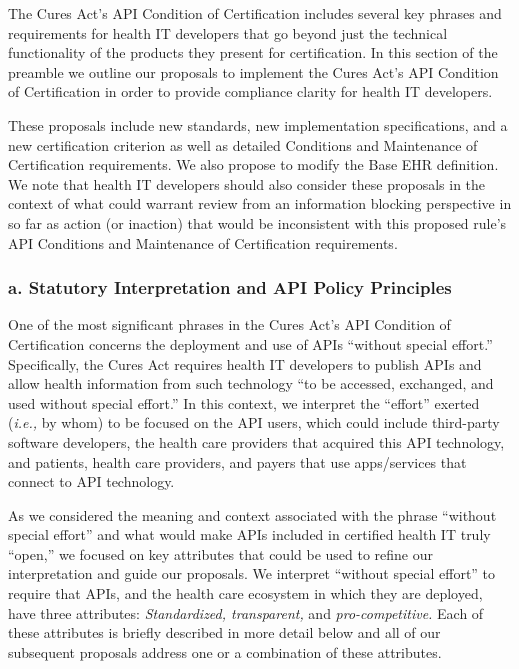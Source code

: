 \documentclass[twoside,11pt]{article}
\begin{document}
          The Cures Act's API Condition of Certification includes several key phrases and requirements for health IT developers that go beyond just the technical functionality of the products they present for certification. In this section of the preamble we outline our proposals to implement the Cures Act's API Condition of Certification in order to provide compliance clarity for health IT developers.


          These proposals include new standards, new implementation specifications, and a new certification criterion as well as detailed Conditions and Maintenance of Certification requirements. We also propose to modify the Base EHR definition. We note that health IT developers should also consider these proposals in the context of what could warrant review from an information blocking perspective in so far as action (or inaction) that would be inconsistent with this proposed rule's API Conditions and Maintenance of Certification requirements.


          \subsubsection{a. Statutory Interpretation and API Policy Principles}


          One of the most significant phrases in the Cures Act's API Condition of Certification concerns the deployment and use of APIs “without special effort.” Specifically, the Cures Act requires health IT developers to publish APIs and allow health information from such technology “to be accessed, exchanged, and used without special effort.” In this context, we interpret the “effort” exerted (\emph{i.e.,} by whom) to be focused on the API users, which could include third-party software developers, the health care providers that acquired this API technology, and patients, health care providers, and payers that use apps/services that connect to API technology.



          As we considered the meaning and context associated with the phrase “without special effort” and what  \ifhmode\expandafter\xspace\fi would make APIs included in certified health IT truly “open,” we focused on key attributes that could be used to refine our interpretation and guide our proposals. We interpret “without special effort” to require that APIs, and the health care ecosystem in which they are deployed, have three attributes: \emph{Standardized, transparent,} and \emph{pro-competitive.} Each of these attributes is briefly described in more detail below and all of our subsequent proposals address one or a combination of these attributes.
\end{document}
